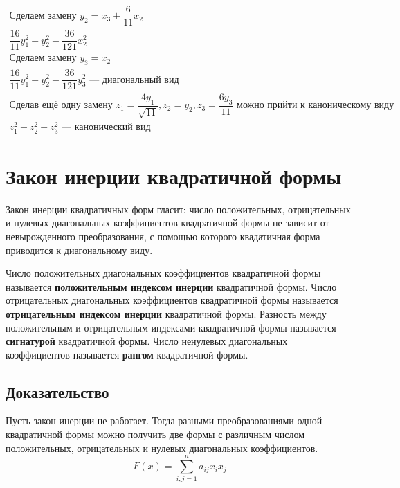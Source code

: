 \documentclass[12pt]{article}
\begin{document}
\[\begin{array}{l}
            \text{Сделаем замену } y_2 = x_3 + \dfrac{6}{11}x_2                                                                                             \\
            \dfrac{16}{11}y_1^2 + y_2^2 - \dfrac{36}{121}x_2^2                                                                                              \\
            \text{Сделаем замену } y_3 = x_2                                                                                                                \\
            \dfrac{16}{11}y_1^2 + y_2^2 - \dfrac{36}{121}y_3^2 \text{ — диагональный вид}                                                                   \\
            \text{Сделав ещё одну замену } z_1 = \dfrac{4y_1}{\sqrt{11}}, z_2 = y_2, z_3 = \dfrac{6y_3}{11} \text{ можно прийти к каноническому виду}       \\
            z_1^2 + z_2^2 - z_3^2 \text{ — канонический вид}
        \end{array}
    \]

    \section{Закон инерции квадратичной формы}
    Закон инерции квадратичных форм гласит: число положительных, отрицательных и нулевых диагональных коэффициентов квадратичной формы не зависит от невырожденного преобразования, с помощью которого квадатичная форма приводится к диагональному виду.

    Число положительных диагональных коэффициентов квадратичной формы называется \textbf{положительным индексом инерции} квадратичной формы. Число отрицательных диагональных коэффициентов квадратичной формы называется \textbf{отрицательным индексом инерции} квадратичной формы. Разность между положительным и отрицательным индексами квадратичной формы называется \textbf{сигнатурой} квадратичной формы. Число ненулевых диагональных коэффициентов называется \textbf{рангом} квадратичной формы.

    \subsection{Доказательство}
    Пусть закон инерции не работает. Тогда разными преобразованиями одной квадратичной формы можно получить две формы с различным числом положительных, отрицательных и нулевых диагональных коэффициентов.
    \[
        F(x) = \sum^n_{i,j=1}a_{ij}x_ix_j
    \]
\end{document}
